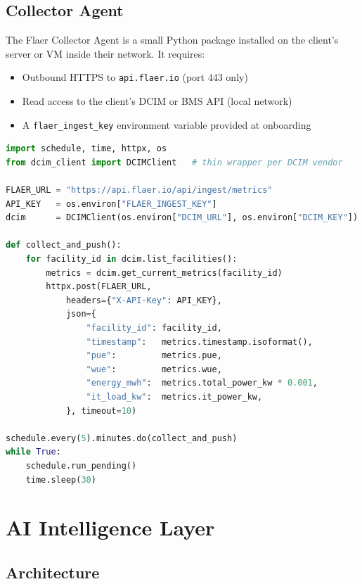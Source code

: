 \documentclass[11pt, a4paper]{article}
\begin{document}
\subsection{Collector Agent}

The Flaer Collector Agent is a small Python package installed on the client's server or VM inside their network. It requires:

\begin{itemize}[leftmargin=1.4em]
  \item Outbound HTTPS to \texttt{api.flaer.io} (port 443 only)
  \item Read access to the client's DCIM or BMS API (local network)
  \item A \texttt{flaer\_ingest\_key} environment variable provided at onboarding
\end{itemize}

\begin{lstlisting}[language=Python, caption=Collector Agent core loop (simplified)]
import schedule, time, httpx, os
from dcim_client import DCIMClient   # thin wrapper per DCIM vendor

FLAER_URL = "https://api.flaer.io/api/ingest/metrics"
API_KEY   = os.environ["FLAER_INGEST_KEY"]
dcim      = DCIMClient(os.environ["DCIM_URL"], os.environ["DCIM_KEY"])

def collect_and_push():
    for facility_id in dcim.list_facilities():
        metrics = dcim.get_current_metrics(facility_id)
        httpx.post(FLAER_URL,
            headers={"X-API-Key": API_KEY},
            json={
                "facility_id": facility_id,
                "timestamp":   metrics.timestamp.isoformat(),
                "pue":         metrics.pue,
                "wue":         metrics.wue,
                "energy_mwh":  metrics.total_power_kw * 0.001,
                "it_load_kw":  metrics.it_power_kw,
            }, timeout=10)

schedule.every(5).minutes.do(collect_and_push)
while True:
    schedule.run_pending()
    time.sleep(30)
\end{lstlisting}

\section{AI Intelligence Layer}

\subsection{Architecture}
\end{document}

